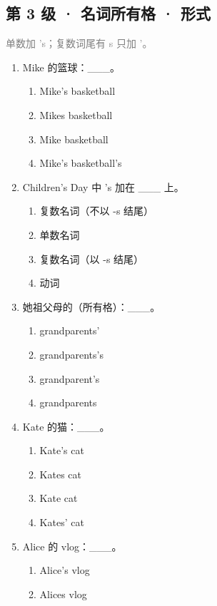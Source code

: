 \documentclass[11pt,a4paper]{ctexart}
\begin{document}
\subsection*{第 3 级 · 名词所有格 · 形式}
\noindent\textcolor{gray}{单数加 ’s；复数词尾有 s 只加 ’。}\par\smallskip
\begin{enumerate}[leftmargin=*,itemsep=4pt]
\item Mike 的篮球：\_\_\_。
\begin{enumerate}[label=\Alph*.,leftmargin=2em,itemsep=1pt,topsep=2pt]
\item Mike’s basketball
\item Mikes basketball
\item Mike basketball
\item Mike’s basketball’s
\end{enumerate}
\item Children’s Day 中 ’s 加在 \_\_\_ 上。
\begin{enumerate}[label=\Alph*.,leftmargin=2em,itemsep=1pt,topsep=2pt]
\item 复数名词（不以 -s 结尾）
\item 单数名词
\item 复数名词（以 -s 结尾）
\item 动词
\end{enumerate}
\item 她祖父母的（所有格）：\_\_\_。
\begin{enumerate}[label=\Alph*.,leftmargin=2em,itemsep=1pt,topsep=2pt]
\item grandparents’
\item grandparents’s
\item grandparent’s
\item grandparents
\end{enumerate}
\item Kate 的猫：\_\_\_。
\begin{enumerate}[label=\Alph*.,leftmargin=2em,itemsep=1pt,topsep=2pt]
\item Kate’s cat
\item Kates cat
\item Kate cat
\item Kates’ cat
\end{enumerate}
\item Alice 的 vlog：\_\_\_。
\begin{enumerate}[label=\Alph*.,leftmargin=2em,itemsep=1pt,topsep=2pt]
\item Alice’s vlog
\item Alices vlog

\end{enumerate}
\end{enumerate}
\end{document}
